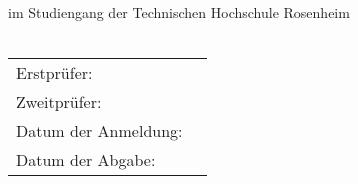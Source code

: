 %
\thispagestyle{empty} %
%
\vspace*{-3cm} %
%
\vspace*{0.2\textheight}        %
\begin{center}
	\Huge \textbf   
	\lasmtitle\\
	\vspace{4ex}
	\large \textbf  
	\lasmthesistype\\
 	\large \textnormal
	im Studiengang \lasmthesisstudies der Technischen Hochschule Rosenheim\\ 
	\vspace{6ex}
	\Large \textbf 
	\lasmauthor\\ 
	\large \textrm
	\vfill
	\begin{tabular}{ll}
		Erstprüfer: & \lasmthesisSupervisorA\\
		Zweitprüfer: & \lasmthesisSupervisorB
		\vspace{4ex}\\
		Datum der Anmeldung: & \lasmthesisRegDate\\
		Datum der Abgabe: & \lasmdate
	\end{tabular}
\end{center}  
%
%

